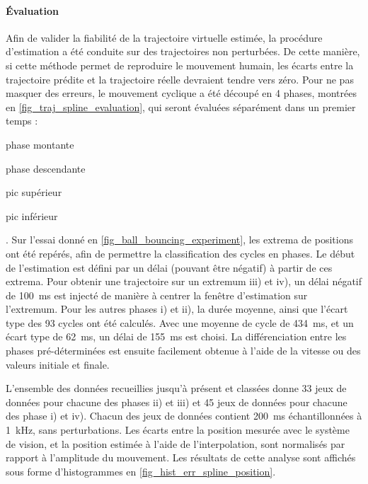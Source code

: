 \documentclass[12pt, a4paper]{article} %
\numberwithin{equation}{section}
\begin{document}
\paragraph{Évaluation} Afin de valider la fiabilité de la trajectoire virtuelle estimée, la procédure d'estimation a été conduite sur des trajectoires non perturbées. De cette manière, si cette méthode permet de reproduire le mouvement humain, les écarts entre la trajectoire prédite et la trajectoire réelle devraient tendre vers zéro. Pour ne pas masquer des erreurs, le mouvement cyclique a été découpé en 4 phases, montrées en \cref{fig_traj_spline_evaluation}, qui seront évaluées séparément dans un premier temps : 
\begin{enumerate*}[label=\roman*),itemjoin={,\quad}] 
	\item phase montante
	\item phase descendante
	\item pic supérieur
	\item pic inférieur
\end{enumerate*}. 
%
\newlineBlank
%
Sur l'essai donné en \cref{fig_ball_bouncing_experiment}, les extrema de positions ont été repérés, afin de permettre la classification des cycles en phases. Le début de l'estimation est défini par un délai (pouvant être négatif) à partir de ces extrema. Pour obtenir une trajectoire sur un extremum iii) et iv), un délai négatif de \SI{100}{\milli\second} est injecté de manière à centrer la fenêtre d'estimation sur l'extremum. Pour les autres phases i) et ii), la durée moyenne, ainsi que l'écart type des 93 cycles ont été calculés. Avec une moyenne de cycle de \SI{434}{\milli\second}, et un écart type de \SI{62}{\milli\second}, un délai de \SI{155}{\milli\second} est choisi. La différenciation entre les phases pré-déterminées est ensuite facilement obtenue à l'aide de la vitesse ou des valeurs initiale et finale.
%


L'ensemble des données recueillies jusqu'à présent et classées donne 33 jeux de données pour chacune des phases ii) et iii) et 45 jeux de données pour chacune des phase i) et iv). Chacun des jeux de données contient \SI{200}{\milli\second} échantillonnées à \SI{1}{\kilo\hertz}, sans perturbations. Les écarts entre la position mesurée avec le système de vision, et la position estimée à l'aide de l'interpolation, sont normalisés par rapport à l'amplitude du mouvement. Les résultats de cette analyse sont affichés sous forme d'histogrammes en \cref{fig_hist_err_spline_position}. 
%

\end{document}
